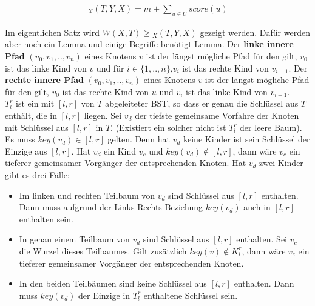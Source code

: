 \documentclass[a4paper,12pt]{article}
\begin{document}
\begin{align*}
_X(T, Y, X)  = m + \sum_{u \in U} {\mathit{score}} \left(u\right)
\end{align*} 

\noindent Im eigentlichen Satz wird $\mathit{W\left(X, T\right)} \geq {_X(T, Y, X)} $ gezeigt werden. Dafür werden aber noch ein Lemma und einige Begriffe benötigt Lemma. Der \textbf{linke innere Pfad} $\left(v_0,v_1,..,v_n \right)$ eines Knotens $v$ ist der längst mögliche Pfad für den gilt, $v_0$ ist das linke Kind von $v$ und für $i \in \{1,..,n\}$,$v_i$ ist das rechte Kind von $v_{i-1}$. Der \textbf{rechte innere Pfad} $\left(v_0,v_1,..,v_n \right)$ eines Knotens $v$ ist der längst mögliche Pfad für den gilt, $v_0$ ist das rechte Kind von $u$ und $v_i$ ist das linke Kind von $v_{i-1}$.\\ $T^r_l$ ist ein mit $\left[l,r\right]$ von $T$ abgeleiteter BST, so dass er genau die Schlüssel aus $T$ enthält, die in $\left[l, r\right]$ liegen. Sei $v_d$ der tiefste gemeinsame Vorfahre der Knoten mit Schlüssel aus  $\left[l,r\right]$ in $T$. (Existiert ein solcher nicht ist $T^r_l$ der leere Baum). Es muss $\mathit{key}(v_d) \in \left[l,r\right]$ gelten. Denn hat $v_d$ keine Kinder ist sein Schlüssel der Einzige aus $\left[l,r\right]$. Hat $v_d$ ein Kind $v_{c}$ und $\mathit{key}(v_d) \notin \left[l,r\right]$, dann wäre $v_{c}$ ein tieferer gemeinsamer Vorgänger der entsprechenden Knoten. Hat $v_d$ zwei Kinder gibt es drei Fälle:
\begin{itemize}
	\item Im linken und rechten Teilbaum von $v_d$ sind Schlüssel aus $\left[l,r\right]$ enthalten. Dann muss aufgrund der Links-Rechts-Beziehung  $\mathit{key}(v_d)$ auch in $\left[l,r\right]$ enthalten sein.
	\item In genau einem Teilbaum von $v_d$ sind Schlüssel aus $\left[l,r\right]$ enthalten. Sei $v_{c}$ die Wurzel dieses Teilbaumes. Gilt zusätzlich $\mathit{key}(v) \notin K^r_l$, dann wäre $v_c$ ein tieferer gemeinsamer Vorgänger der entsprechenden Knoten.
	\item In den beiden Teilbäumen sind keine Schlüssel aus $\left[l,r\right]$ enthalten.  Dann muss $\mathit{key}(v_d)$ der Einzige in $T^r_l$ enthaltene Schlüssel sein.
\end{itemize}
\end{document}
